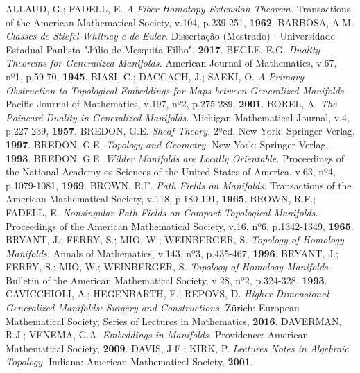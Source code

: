 \documentclass[12pt,oneside]{book} %
\begin{document}
\begin{thebibliography}{99}
	\thispagestyle{empty}
	
	 ALLAUD, G.; FADELL, E. \textit{A Fiber Homotopy Extension Theorem.} Transactions of the American Mathematical Society, v.104, p.239-251, \textbf{1962}.
	 BARBOSA, A.M. \textit{Classes de Stiefel-Whitney e de Euler.} Dissertação (Mestrado) - Universidade Estadual Paulista "Júlio de Mesquita Filho", \textbf{2017}.
	 BEGLE, E.G. \textit{Duality Theorems for Generalized Manifolds.} American Journal of Mathematics, v.67, nº1, p.59-70, \textbf{1945}.
	 BIASI, C.; DACCACH, J.; SAEKI, O. \textit{A Primary Obstruction to Topological Embeddings for Maps between Generalized Manifolds.} Pacific Journal of Mathematics, v.197, nº2, p.275-289, \textbf{2001}.
	 BOREL, A. \textit{The Poincaré Duality in Generalized Manifolds.} Michigan Mathematical Journal, v.4, p.227-239, \textbf{1957}.
	 BREDON, G.E. \textit{Sheaf Theory.} 2ªed. New York: Springer-Verlag, \textbf{1997}.
	 BREDON, G.E. \textit{Topology and Geometry.} New-York: Springer-Verlag, \textbf{1993}.
	 BREDON, G.E. \textit{Wilder Manifolds are Locally Orientable.} Proceedings of the National Academy os Sciences of the United States of America, v.63, nº4, p.1079-1081, \textbf{1969}.
	 BROWN, R.F. \textit{Path Fields on Manifolds.} Transactions of the American Mathematical Society, v.118, p.180-191, \textbf{1965}.
	 BROWN, R.F.; FADELL, E. \textit{Nonsingular Path Fields on Compact Topological Manifolds.} Proceedings of the American Mathematical Society, v.16, nº6, p.1342-1349, \textbf{1965}. 
	 BRYANT, J.; FERRY, S.; MIO, W.; WEINBERGER, S. \textit{Topology of Homology Manifolds.} Annals of Mathematics, v.143, nº3, p.435-467, \textbf{1996}.
	 BRYANT, J.; FERRY, S.; MIO, W.; WEINBERGER, S. \textit{Topology of Homology Manifolds.} Bulletin of the American Mathematical Society, v.28, nº2, p.324-328, \textbf{1993}.
	 CAVICCHIOLI, A.; HEGENBARTH, F.; REPOVS, D. \textit{Higher-Dimensional Generalized Manifolds: Surgery and Constructions.} Zürich: European Mathematical Society, Series of Lectures in Mathematics, \textbf{2016}.
	 DAVERMAN, R.J.; VENEMA, G.A. \textit{Embeddings in Manifolds.} Providence: American Mathematical Society, \textbf{2009}.
	 DAVIS, J.F.; KIRK, P. \textit{Lectures Notes in Algebraic Topology.} Indiana: American Mathematical Society, \textbf{2001}.

\end{thebibliography}
\end{document}
